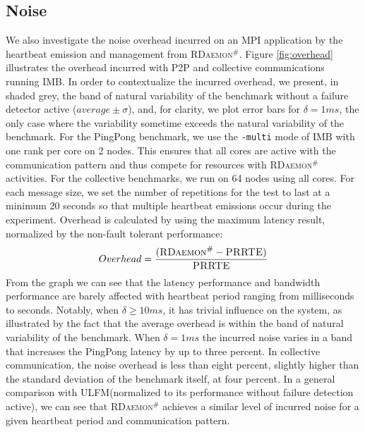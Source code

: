 \documentclass[5p,times,twocolumn]{elsarticle}
\newcommand{\prrte}[0]{\textsc{PRRTE}\xspace}
\newcommand{\ulfm}[0]{\textsc{ULFM}\xspace}
\newcommand{\mpi}[0]{\textsc{MPI}\xspace}
\newcommand{\ourwork}[0]{\textsc{RDaemon}\ensuremath{^\#}\xspace}
\newcommand{\imb}[0]{\textsc{IMB}\xspace}
\begin{document}
\subsection{Noise}
We also investigate the noise overhead incurred on an \mpi application by the heartbeat emission
and management from \ourwork.
Figure \ref{fig:overhead} illustrates the overhead incurred with P2P and collective communications running \imb.
In order to contextualize the incurred overhead, we present, in shaded grey, the band of natural variability
of the benchmark without a failure detector active ($average \pm \sigma$), and, for clarity, we plot error bars for $ \delta = 1 ms$, the only case where the variability sometime exceeds the natural variability of the benchmark.
For the PingPong benchmark, we use the \texttt{-multi} mode of IMB with one rank per core on 2 nodes.
This ensures that all cores are active with the communication pattern and thus
compete for resources with \ourwork activities.
For the collective benchmarks, we run on 64 nodes using all cores. For each message size, we set the number of
repetitions for the test to last at a minimum 20 seconds so that multiple heartbeat emissions occur during the experiment. Overhead is calculated by using the maximum latency result, normalized by the non-fault tolerant performance:
\begin{equation}
Overhead = \frac{( {\ourwork - \prrte} )}{\prrte}\label{eq.overhead}
\end{equation}
 From the graph we can see that the latency performance and bandwidth performance are barely affected with heartbeat period ranging from milliseconds to seconds. Notably, when $ \delta \geq 10 ms $, it has trivial influence on the system, as illustrated by the fact that the average overhead is within the band of natural variability of the benchmark. When  $ \delta = 1 ms $ the incurred noise varies in a band that increases the PingPong latency by up to three percent. In collective communication, the noise overhead is less than eight percent, slightly higher than the standard deviation of the benchmark itself, at four percent.
 In a general comparison with \ulfm (normalized to its performance without failure detection active),
 we can see that \ourwork achieves a similar level of incurred noise for a given
 heartbeat period and communication pattern.
\end{document}
